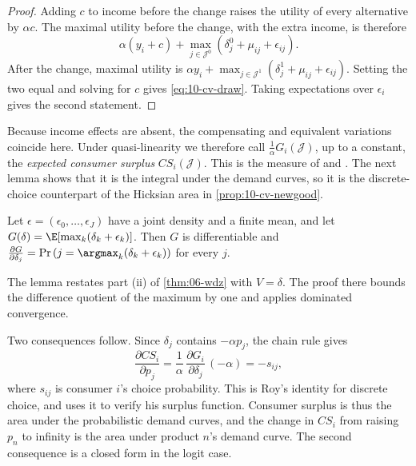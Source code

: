 \begin{proof}
Adding $c$ to income before the change raises the utility of every alternative by $\alpha c$. The maximal utility
before the change, with the extra income, is therefore
\begin{equation*}
\alpha(y_i + c) + \max_{j\in\mathcal{J}^0}\left(\delta^0_j + \mu_{ij} + \epsilon_{ij}\right).
\end{equation*}
After the change, maximal utility is $\alpha y_i + \max_{j\in\mathcal{J}^1}(\delta^1_j + \mu_{ij} + \epsilon_{ij})$.
Setting the two equal and solving for $c$ gives \eqref{eq:10-cv-draw}. Taking expectations over $\epsilon_i$ gives
the second statement.
\end{proof}

Because income effects are absent, the compensating and equivalent variations coincide here. Under quasi-linearity
we therefore call $\frac{1}{\alpha}G_i(\mathcal{J})$, up to a constant, the \emph{expected consumer surplus}
$CS_i(\mathcal{J})$. This is the measure of \citet{SmallRosen1981} and \citet{McFadden1981}. The next lemma shows
that it is the integral under the demand curves, so it is the discrete-choice counterpart of the Hicksian area in
\cref{prop:10-cv-newgood}.

\begin{lemma}\label{lem:10-wdz}
Let $\epsilon = (\epsilon_0,\dots,\epsilon_J)$ have a joint density and a finite mean, and let
$G(\delta) = \E[\max_k(\delta_k + \epsilon_k)]$. Then $G$ is differentiable and
$\frac{\partial G}{\partial \delta_j} = \Pr\left(j = \argmax_k(\delta_k + \epsilon_k)\right)$ for every $j$.
\end{lemma}

The lemma restates part (ii) of \cref{thm:06-wdz} with $V = \delta$. The proof there bounds the difference
quotient of the maximum by one and applies dominated convergence.

Two consequences follow. Since $\delta_j$ contains $-\alpha p_j$, the chain rule gives
\begin{equation}\label{eq:10-roy}
\frac{\partial CS_i}{\partial p_j} = \frac{1}{\alpha}\,\frac{\partial G_i}{\partial \delta_j}\,(-\alpha) = -s_{ij},
\end{equation}
where $s_{ij}$ is consumer $i$'s choice probability. This is Roy's identity for discrete choice, and
\citet[p.~19, n.~18]{Trajtenberg1985} uses it to verify his surplus function. Consumer surplus is thus the area under
the probabilistic demand curves, and the change in $CS_i$ from raising $p_n$ to infinity is the area under
product $n$'s demand curve. The second consequence is a closed form in the logit case.

